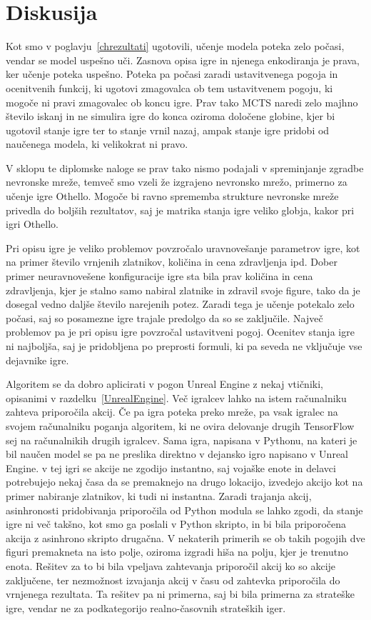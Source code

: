 \documentclass[a4paper, 12pt]{book}
\begin{document}
\chapter{Diskusija}
\label{chdiskusija}

Kot smo v poglavju~\ref{chrezultati} ugotovili, učenje modela poteka zelo počasi, vendar se model uspešno uči.
Zasnova opisa igre in njenega enkodiranja je prava, ker učenje poteka uspešno.
Poteka pa počasi zaradi ustavitvenega pogoja in ocenitvenih funkcij, ki ugotovi zmagovalca ob tem ustavitvenem pogoju, ki mogoče ni pravi zmagovalec ob koncu igre.
Prav tako MCTS naredi zelo majhno število iskanj in ne simulira igre do konca oziroma določene globine, kjer bi ugotovil stanje igre ter to stanje vrnil nazaj, ampak stanje igre pridobi od naučenega modela, ki velikokrat ni pravo.



V sklopu te diplomske naloge se prav tako nismo podajali v spreminjanje zgradbe nevronske mreže, temveč smo vzeli že izgrajeno nevronsko mrežo, primerno za učenje igre Othello.
Mogoče bi ravno sprememba strukture nevronske mreže privedla do boljših rezultatov, saj je matrika stanja igre veliko globja, kakor pri igri Othello.

Pri opisu igre je veliko problemov povzročalo uravnovešanje parametrov igre, kot na primer število vrnjenih zlatnikov, količina in cena zdravljenja ipd.
Dober primer neuravnovešene konfiguracije igre sta bila prav količina in cena zdravljenja, kjer je stalno samo nabiral zlatnike in zdravil svoje figure, tako da je dosegal vedno daljše število narejenih potez.
Zaradi tega je učenje potekalo zelo počasi, saj so posamezne igre trajale predolgo da so se zaključile.
Največ problemov pa je pri opisu igre povzročal ustavitveni pogoj.
Ocenitev stanja igre ni najboljša, saj je pridobljena po preprosti formuli, ki pa seveda ne vključuje vse dejavnike igre.



Algoritem se da dobro aplicirati v pogon Unreal Engine z nekaj vtičniki, opisanimi v razdelku~\ref{UnrealEngine}. Več igralcev lahko na istem računalniku zahteva priporočila akcij. 
Če pa igra poteka preko mreže, pa vsak igralec na svojem računalniku poganja algoritem, ki ne ovira delovanje drugih TensorFlow sej na računalnikih drugih igralcev.
Sama igra, napisana v Pythonu, na kateri je bil naučen model se pa ne preslika direktno v dejansko igro napisano v Unreal Engine.
v tej igri se akcije ne zgodijo instantno, saj vojaške enote in delavci potrebujejo nekaj časa da se premaknejo na drugo lokacijo, izvedejo akcijo kot na primer nabiranje zlatnikov, ki tudi ni instantna.
Zaradi trajanja akcij, asinhronosti pridobivanja priporočila od Python modula se lahko zgodi, da stanje igre ni več takšno, kot smo ga poslali v Python skripto, in bi bila priporočena akcija z asinhrono skripto drugačna. 
V nekaterih primerih se ob takih pogojih dve figuri premakneta na isto polje, oziroma izgradi hiša na polju, kjer je trenutno enota. 
Rešitev za to bi bila vpeljava zahtevanja priporočil akcij ko so akcije zaključene, ter nezmožnost izvajanja akcij v času od zahtevka priporočila do vrnjenega rezultata.
Ta rešitev pa ni primerna, saj bi bila primerna za strateške igre, vendar ne za podkategorijo realno-časovnih strateških iger.
\end{document}
